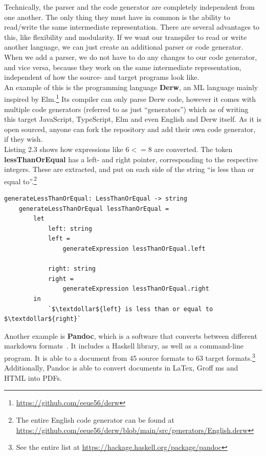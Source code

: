Technically, the parser and the code generator are completely independent from one another. The only thing they must have in common is the ability to read/write the same intermediate representation. There are several advantages to this, like flexibility and modularity. If we want our transpiler to read or write another language, we can just create an additional parser or code generator. When we add a parser, we do not have to do any changes to our code generator, and vice versa, because they work on the same intermediate representation, independent of how the source- and target programs look like. \hfill \\

An example of this is the programming language \textbf{Derw}, an ML language mainly inspired by Elm.\footnote{\url{https://github.com/eeue56/derw}} Its compiler can only parse Derw code, however it comes with multiple code generators (referred to as just ``generators'') which as of writing this target JavaScript, TypeScript, Elm and even English and Derw itself. As it is open sourced, anyone can fork the repository and add their own code generator, if they wish. \hfill \\

Listing 2.3 shows how expressions like $6 <= 8$ are converted. The token \textbf{lessThanOrEqual} has a left- and right pointer, corresponding to the respective integers. These are extracted, and put on each side of the string ``is less than or equal to''.\footnote{The entire English code generator can be found at \url{https://github.com/eeue56/derw/blob/main/src/generators/English.derw}} \hfill \\

\begin{lstlisting}[caption={The function that converts a ``less than or equal''-expression in Derw to English}, captionpos=b]
    generateLessThanOrEqual: LessThanOrEqual -> string
    generateLessThanOrEqual lessThanOrEqual =
        let
            left: string
            left =
                generateExpression lessThanOrEqual.left

            right: string
            right =
                generateExpression lessThanOrEqual.right
        in
            `$\textdollar${left} is less than or equal to $\textdollar${right}`
\end{lstlisting}

Another example is \textbf{Pandoc}, which is a software that converts between different markdown formats~\cite{dominici2014}. It includes a Haskell library, as well as a command-line program. It is able to a document from 45 source formats to 63 target formats.\footnote{See the entire list at \url{https://hackage.haskell.org/package/pandoc}} Additionally, Pandoc is able to convert documents in LaTex, Groff ms and HTML into PDFs. \hfill \\

